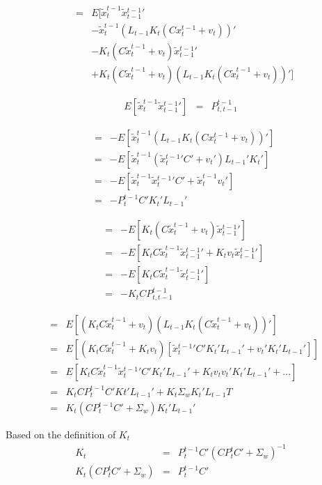 \documentclass[12pt]{report}
\begin{document}
\begin{eqnarray}
&=& E\bigg[
  \tilde{x}_t^{t-1}\tilde{x}{_{t-1}^{t-1}}' \label{exp1} \\
&& -
  \tilde{x}_t^{t-1}(L_{t-1}K_t(Cx_t^{t-1}+v_t))' \label{exp2} \\
&& -
  K_t(C\tilde{x}_t^{t-1}+v_t)\tilde{x}{_{t-1}^{t-1}}' \label{exp3}  \\
&& +
  K_t(C\tilde{x}_t^{t-1}+v_t)(L_{t-1}K_t(C\tilde{x}_t^{t-1}+ v_t))' \label{exp4} \bigg]
\end{eqnarray}

\begin{eqnarray*}
E[\tilde{x}_t^{t-1}\tilde{x}{_{t-1}^{t-1}}'] &=& P_{t,t-1}^{t-1}
\end{eqnarray*}

\begin{eqnarray*}
  &=& -E[ \tilde{x}_t^{t-1}(L_{t-1}K_t(Cx_t^{t-1}+v_t))' ] \\
  &=& -E[\tilde{x}_t^{t-1}(\tilde{x}{_t^{t-1}}'C' + v_t') L_{t-1}' K_t'] \\
  &=& -E[\tilde{x}_t^{t-1}\tilde{x}{_t^{t-1}}'C' + \tilde{x}_t^{t-1}v_t'] \\
  &=& -P_t^{t-1}C'K_t'L_{t-1}'
\end{eqnarray*}

\begin{eqnarray*}
  &=& -E[K_t(C\tilde{x}_t^{t-1}+v_t)\tilde{x}{_{t-1}^{t-1}}' ] \\
  &=& -E[K_tC\tilde{x}_t^{t-1}\tilde{x}{_{t-1}^{t-1}}' + K_tv_t\tilde{x}{_{t-1}^{t-1}}']\\
  &=& -E[K_tC\tilde{x}_t^{t-1}\tilde{x}{_{t-1}^{t-1}}']\\
  &=& -K_tCP_{t,t-1}^{t-1}
\end{eqnarray*}


\begin{eqnarray*}
  &=& E[(K_t C \tilde{x}_t^{t-1} + v_t)(L_{t-1}K_t(C\tilde{x}_t^{t-1}+ v_t))']\\
  &=& E[(K_tC\tilde{x}_t^{t-1} + K_tv_t) 
    [ \tilde{x}{_t^{t-1}}' C' K_t' L_{t-1}' + v_t' K_t'L_{t-1}'] ] \\
  &=& E[K_t C \tilde{x}_t^{t-1} \tilde{x}{_t^{t-1}}' C' K_t' L_{t-1}' +
    K_tv_t v_t' K_t'L_{t-1}' + ... ]\\
  &=& K_tCP_t^{t-1}C'Kt'L_{t-1}' + K_t\Sigma_wK_t'L_{t-1}T\\
  &=& K_t(CP_t^{t-1}C' + \Sigma_w)K_t'L_{t-1}'
\end{eqnarray*}

Based on the definition of $K_t$ 
\begin{eqnarray*}
K_t &=& P_{t}^{t-1}C' (CP_{t}^tC'+ \Sigma_{w})^{-1}\\
K_t (CP_{t}^tC'+ \Sigma_{w}) &=& P_{t}^{t-1} C'
\end{eqnarray*}
\end{document}
